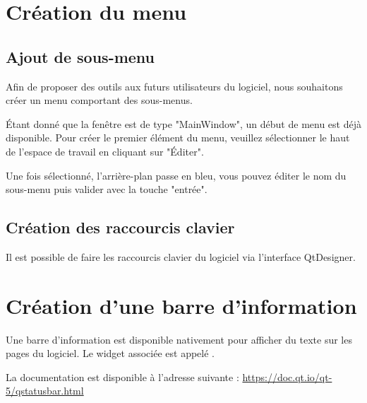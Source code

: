 
\section{Création du menu}

\subsection{Ajout de sous-menu}

Afin de proposer des outils aux futurs utilisateurs du logiciel, nous souhaitons créer un menu comportant des sous-menus.




Étant donné que la fenêtre est de type "MainWindow", un début de menu est déjà disponible. Pour créer le premier élément du menu, veuillez sélectionner le haut de l'espace de travail en cliquant sur "Éditer". \newline



Une fois sélectionné, l'arrière-plan passe en bleu, vous pouvez éditer le nom du sous-menu puis valider avec la touche "entrée".

\subsection{Création des raccourcis clavier}

Il est possible de faire les raccourcis clavier du logiciel via l'interface QtDesigner. 


\section{Création d'une barre d'information}

Une barre d'information est disponible nativement pour afficher du texte sur les pages du logiciel. \newline Le widget associée est appelé .




La documentation est disponible à l'adresse suivante : \newline \url{https://doc.qt.io/qt-5/qstatusbar.html}

